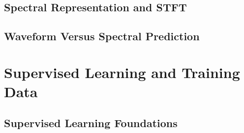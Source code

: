 \subsection{Spectral Representation and STFT}

%
%


\subsection{Waveform Versus Spectral Prediction}

%
%
%


\section{Supervised Learning and Training Data}
\label{sec:predictor_training}

\subsection{Supervised Learning Foundations}

%
%



